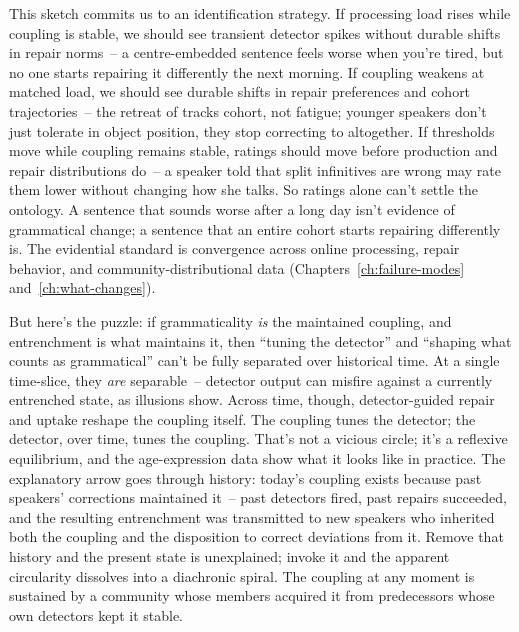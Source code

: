 This sketch commits us to an identification strategy. If processing load rises while coupling is stable, we should see transient detector spikes without durable shifts in repair norms~-- a centre-embedded sentence feels worse when you're tired, but no one starts repairing it differently the next morning. If coupling weakens at matched load, we should see durable shifts in repair preferences and cohort trajectories~-- the retreat of  tracks cohort, not fatigue; younger speakers don't just tolerate  in object position, they stop correcting to  altogether. If thresholds move while coupling remains stable, ratings should move before production and repair distributions do~-- a speaker told that split infinitives are wrong may rate them lower without changing how she talks. So ratings alone can't settle the ontology. A sentence that sounds worse after a long day isn't evidence of grammatical change; a sentence that an entire cohort starts repairing differently is. The evidential standard is convergence across online processing, repair behavior, and community-distributional data (Chapters~\ref{ch:failure-modes} and~\ref{ch:what-changes}).

But here's the puzzle: if grammaticality \emph{is} the maintained coupling, and entrenchment is what maintains it, then \enquote{tuning the detector} and \enquote{shaping what counts as grammatical} can't be fully separated over historical time. At a single time-slice, they \emph{are} separable~-- detector output can misfire against a currently entrenched state, as illusions show. Across time, though, detector-guided repair and uptake reshape the coupling itself. The coupling tunes the detector; the detector, over time, tunes the coupling. That's not a vicious circle; it's a reflexive equilibrium, and the age-expression data show what it looks like in practice. The explanatory arrow goes through history: today's coupling exists because past speakers' corrections maintained it~-- past detectors fired, past repairs succeeded, and the resulting entrenchment was transmitted to new speakers who inherited both the coupling and the disposition to correct deviations from it. Remove that history and the present state is unexplained; invoke it and the apparent circularity dissolves into a diachronic spiral. The coupling at any moment is sustained by a community whose members acquired it from predecessors whose own detectors kept it stable.

